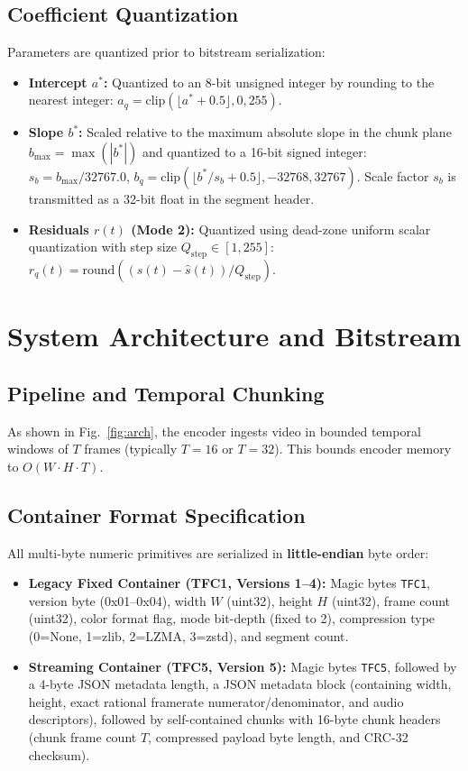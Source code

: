 \documentclass[conference]{IEEEtran}
\begin{document}
\subsection{Coefficient Quantization}
Parameters are quantized prior to bitstream serialization:
\begin{itemize}
    \item \textbf{Intercept $a^*$:} Quantized to an 8-bit unsigned integer by rounding to the nearest integer: $a_q = \text{clip}\left(\lfloor a^* + 0.5 \rfloor, 0, 255\right)$.
    \item \textbf{Slope $b^*$:} Scaled relative to the maximum absolute slope in the chunk plane $b_{\max} = \max(|b^*|)$ and quantized to a 16-bit signed integer: $s_b = b_{\max} / 32767.0$, $b_q = \text{clip}\left(\lfloor b^* / s_b + 0.5 \rfloor, -32768, 32767\right)$. Scale factor $s_b$ is transmitted as a 32-bit float in the segment header.
    \item \textbf{Residuals $r(t)$ (Mode 2):} Quantized using dead-zone uniform scalar quantization with step size $Q_{\text{step}} \in [1, 255]$: $r_q(t) = \text{round}\left((s(t) - \hat{s}(t)) / Q_{\text{step}}\right)$.
\end{itemize}

\section{System Architecture and Bitstream}

\subsection{Pipeline and Temporal Chunking}
As shown in Fig.~\ref{fig:arch}, the encoder ingests video in bounded temporal windows of $T$ frames (typically $T=16$ or $T=32$). This bounds encoder memory to $O(W \cdot H \cdot T)$.

\subsection{Container Format Specification}
All multi-byte numeric primitives are serialized in \textbf{little-endian} byte order:
\begin{itemize}
    \item \textbf{Legacy Fixed Container (TFC1, Versions 1--4):} Magic bytes \texttt{TFC1}, version byte (0x01--0x04), width $W$ (uint32), height $H$ (uint32), frame count (uint32), color format flag, mode bit-depth (fixed to 2), compression type (0=None, 1=zlib, 2=LZMA, 3=zstd), and segment count.
    \item \textbf{Streaming Container (TFC5, Version 5):} Magic bytes \texttt{TFC5}, followed by a 4-byte JSON metadata length, a JSON metadata block (containing width, height, exact rational framerate numerator/denominator, and audio descriptors), followed by self-contained chunks with 16-byte chunk headers (chunk frame count $T$, compressed payload byte length, and CRC-32 checksum).
\end{itemize}
\end{document}
